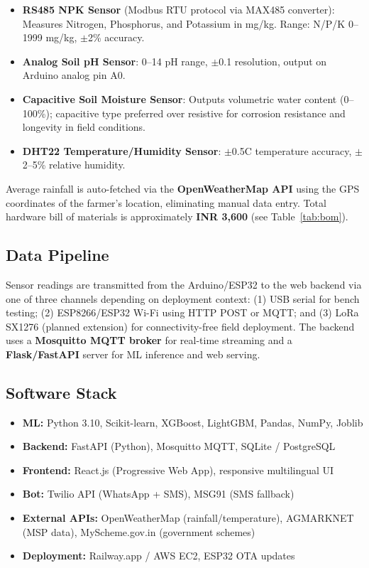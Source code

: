 \documentclass[10pt,twocolumn]{article}
\begin{document}
\begin{itemize}[leftmargin=1.2em, itemsep=1pt]
    \item \textbf{RS485 NPK Sensor} (Modbus RTU protocol via MAX485 converter): Measures Nitrogen, Phosphorus, and Potassium in mg/kg. Range: N/P/K 0--1999 mg/kg, $\pm$2\% accuracy.
    \item \textbf{Analog Soil pH Sensor}: 0--14 pH range, $\pm$0.1 resolution, output on Arduino analog pin A0.
    \item \textbf{Capacitive Soil Moisture Sensor}: Outputs volumetric water content (0--100\%); capacitive type preferred over resistive for corrosion resistance and longevity in field conditions.
    \item \textbf{DHT22 Temperature/Humidity Sensor}: $\pm$0.5\textdegree C temperature accuracy, $\pm$2--5\% relative humidity.
\end{itemize}

Average rainfall is auto-fetched via the \textbf{OpenWeatherMap API} using the GPS coordinates of the farmer's location, eliminating manual data entry. Total hardware bill of materials is approximately \textbf{INR 3,600} (see Table~\ref{tab:bom}).

\subsection{Data Pipeline}

Sensor readings are transmitted from the Arduino/ESP32 to the web backend via one of three channels depending on deployment context: (1) USB serial for bench testing; (2) ESP8266/ESP32 Wi-Fi using HTTP POST or MQTT; and (3) LoRa SX1276 (planned extension) for connectivity-free field deployment. The backend uses a \textbf{Mosquitto MQTT broker} for real-time streaming and a \textbf{Flask/FastAPI} server for ML inference and web serving.

\subsection{Software Stack}

\begin{itemize}[leftmargin=1.2em, itemsep=1pt]
    \item \textbf{ML:} Python 3.10, Scikit-learn, XGBoost, LightGBM, Pandas, NumPy, Joblib
    \item \textbf{Backend:} FastAPI (Python), Mosquitto MQTT, SQLite / PostgreSQL
    \item \textbf{Frontend:} React.js (Progressive Web App), responsive multilingual UI
    \item \textbf{Bot:} Twilio API (WhatsApp + SMS), MSG91 (SMS fallback)
    \item \textbf{External APIs:} OpenWeatherMap (rainfall/temperature), AGMARKNET (MSP data), MyScheme.gov.in (government schemes)
    \item \textbf{Deployment:} Railway.app / AWS EC2, ESP32 OTA updates
\end{itemize}
\end{document}
